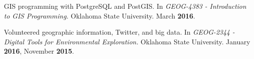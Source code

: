 \begin{cventries}
  \cventry
    {}
    {}
    {}
    {}
    {
      \begin{cvitems}
        \vspace{-3mm}
      \item {GIS programming with PostgreSQL and PostGIS. In \textit{GEOG-4383 -
            Introduction to GIS Programming.} Oklahoma State University. March
          \textbf{2016}.}
            \end{cvitems}
        } %

  \cventry
    {}
    {}
    {}
    {}
    {
      \begin{cvitems}
        \vspace{-3mm}
      \item Volunteered geographic information, Twitter, and big data. In
        {\textit{GEOG-2344 - Digital Tools for Environmental Exploration.}
          Oklahoma State University. January \textbf{2016}, November
          \textbf{2015}}.
        \end{cvitems}
    }

\end{cventries}